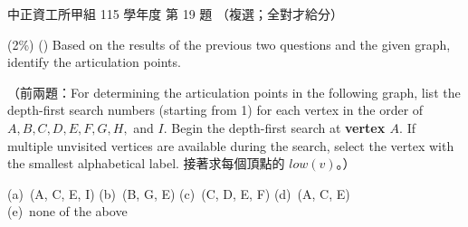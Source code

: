 \begin{pastexam}[label={px:ccu-115-swa-09}]{中正資工所甲組 115 學年度 第 19 題}
（複選；全對才給分）

(2\%) (\qquad) Based on the results of the previous two questions and the given graph, identify the
articulation points.

（前兩題：For determining the articulation points in the following graph, list the depth-first search
numbers (starting from 1) for each vertex in the order of $A, B, C, D, E, F, G, H,$ and $I$. Begin
the depth-first search at \textbf{vertex $A$}. If multiple unvisited vertices are available during
the search, select the vertex with the smallest alphabetical label. 接著求每個頂點的 $low(v)$。）
\begin{center}
\end{center}
(a)~(A, C, E, I) \qquad (b)~(B, G, E) \qquad (c)~(C, D, E, F) \qquad (d)~(A, C, E)\\
(e)~none of the above
\end{pastexam}

